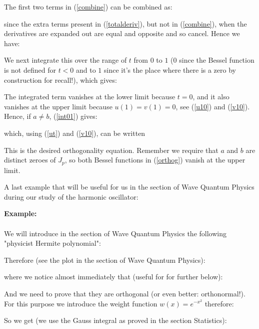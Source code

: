 	\begin{tcolorbox}[colframe=black,colback=white,sharp corners]
	
	The first two terms in (\ref{combine}) can be combined as:
	
	since the extra terms present in (\ref{totalderiv}), but not in (\ref{combine}), when the derivatives are expanded out are equal and opposite and so cancel. Hence we have:
	
	We next integrate this over the range of $t$ from $0$ to $1$ ($0$ since the Bessel function is not defined for $t<0$ and to $1$ since it's the place where there is a zero by construction for recall!), which gives:
	
	The integrated term vanishes at the lower limit because $t=0$, and it also vanishes at the upper limit because $u(1) = v(1) = 0$, see (\ref{u10}) and (\ref{v10}). Hence, if $a \ne b$, (\ref{int01}) gives:
	
	which, using (\ref{ut}) and (\ref{v10}), can be written
	
	This is the desired orthogonality equation. Remember we require that $a$ and $ b$ are distinct zeroes of $J_p$, so both Bessel functions in (\ref{orthog}) vanish at the upper limit.
	\end{tcolorbox}
	
	\pagebreak
	A last example that will be useful for us in the section of Wave Quantum Physics during our study of the harmonic oscillator:
	\begin{tcolorbox}[colframe=black,colback=white,sharp corners]
	\textbf{{\Large {}}Example:}\\\\
	We will introduce in the section of Wave Quantum Physics the following "physicist Hermite polynomial":
	
	Therefore (see the plot in the section of Wave Quantum Physics):
	
	where we notice almost immediately that (useful for for further below):
	
	And we need to prove that they are orthogonal (or even better: orthonormal!).\\
	
	For this purpose we introduce the weight function $w(x)=e^{-x^2}$ therefore:
	
	So we get (we use the Gauss integral as proved in the section Statistics):
	
	\end{tcolorbox}
	
